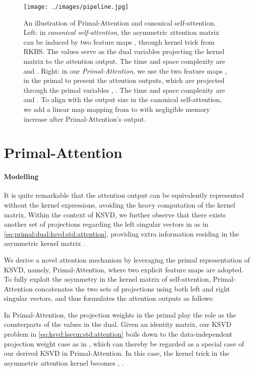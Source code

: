\documentclass{article}
\begin{document}
\begin{figure}[t]
	\centering    
	{\texttt{[image: ./images/pipeline.jpg]}}
	\caption{An illustration of Primal-Attention and canonical self-attention.
		Left: in \emph{canonical self-attention}, the asymmetric attention matrix  can be induced by two feature maps ,  through kernel trick from RKBS. 
		The values  serve as the dual variables projecting the kernel matrix  to the attention output. 
		The time and space complexity are { and }. 
		Right: in our \emph{Primal-Attention}, we use the two feature maps ,  in the primal to present the attention outputs, which are projected through the primal variables , . 
		The time and space complexity are  and .
		To align with the output size in the canonical self-attention, we add a linear map mapping from  to  with negligible memory increase after Primal-Attention's output.}
	\label{fig::pipeline}
	\vspace{-3mm}
\end{figure}

\section{Primal-Attention}
\label{sec::method}
\paragraph{Modelling}
It is quite remarkable that the attention output can be equivalently represented without the kernel expressions, avoiding the heavy computation of the kernel matrix. 
{Within} the context of KSVD, we further observe that there exists another set of projections  regarding the left singular vectors in  as  in \eqref{eq:primal:dual:ksvd:std:attention}, providing extra information residing in the asymmetric kernel matrix .

We derive a novel attention mechanism by leveraging the primal representation of KSVD, namely, Primal-Attention, where two explicit feature maps  are adopted. 
To fully exploit the asymmetry in the kernel matrix of self-attention, Primal-Attention concatenates the two sets of projections using both left and right singular vectors, and thus formulates the attention outputs {as follows:}

In Primal-Attention, the projection weights  in the primal play the role as the counterparts of the values in the dual. 
{Given  an identity matrix, our KSVD problem in \eqref{eq:ksvd:lssvm:std:attention} boils down to the data-independent projection weight case as in \cite{suykens2016svd}, which can thereby be regarded as a special case of our derived KSVD in Primal-Attention.
	In this case, the kernel trick in the asymmetric attention kernel becomes , .}
\end{document}
